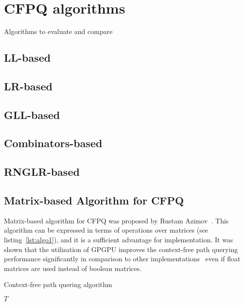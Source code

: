 \section{CFPQ algorithms}

Algorithms to evaluate and compare

\subsection{LL-based}

\subsection{LR-based}

\subsection{GLL-based}

\subsection{Combinators-based}

\subsection{RNGLR-based}

\subsection{Matrix-based Algorithm for CFPQ}

Matrix-based algorithm for CFPQ was proposed by Rustam Azimov~\cite{Azimov:2018:CPQ:3210259.3210264}.
This algorithm can be expressed in terms of operations over matrices (see listing~\ref{lst:algo1}), and it is a sufficient advantage for implementation.
It was shown that the utilization of GPGPU improves the context-free path querying performance significantly in comparison to other implementations~\cite{Azimov:2018:CPQ:3210259.3210264} even if float matrices are used instead of boolean matrices.

\begin{algorithm}
\begin{algorithmic}[1]
\caption{Context-free path quering algorithm}
\label{lst:algo1}

    \EndFor

    \EndWhile
\State \Return $T$
\EndFunction
\end{algorithmic}
\end{algorithm}

